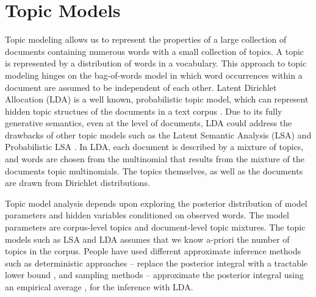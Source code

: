 \section{Topic Models}


Topic modeling allows us to represent the properties of a 
large collection of documents containing numerous words 
with a small collection of topics. 
A topic is represented by a  
distribution of words in a vocabulary.  This approach to 
topic modeling hinges on the bag-of-words model in which 
word occurrences within a document are assumed to be 
independent of each other. 
Latent Dirichlet Allocation (LDA) is a well known, probabilistic 
topic model, which can represent hidden topic structues 
of the documents in a text corpus \cite{Blei2003}. Due to 
its fully generative semantics, even at the level of documents, 
LDA could address the drawbacks of other topic models such as 
the Latent Semantic Analysis (LSA) and Probabilistic LSA \cite{Hofmann1999, Blei2003}. 
In LDA, each document is described by 
a mixture of topics, and words are chosen from the multinomial 
that results from the mixture of the documents topic 
multinomials. The topics themselves, as well as the 
documents are drawn from Dirichlet distributions. 

Topic model analysis depends upon exploring the posterior 
distribution of model parameters and hidden variables 
conditioned on observed words. The model parameters are 
corpus-level topics and document-level topic mixtures. 
The topic models such as LSA and LDA assumes that 
we know a-priori the number of topics in the corpus. 
People have used different approximate inference methods
such as deterministic approaches -- replace the posterior 
integral with a tractable lower bound \cite{Blei2003}, 
and sampling methods -- approximate the posterior integral 
using an empirical average \cite{Griffiths2004}, for the 
inference with LDA. 


